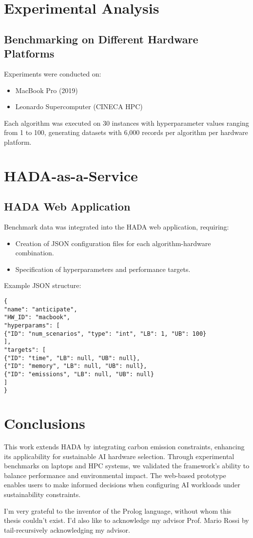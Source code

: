 \documentclass[a4paper,singleside,12pt]{report} %
\begin{document}
\chapter{Experimental Analysis}

\section{Benchmarking on Different Hardware Platforms}
Experiments were conducted on:
\begin{itemize}
\item MacBook Pro (2019)
\item Leonardo Supercomputer (CINECA HPC)
\end{itemize}

Each algorithm was executed on 30 instances with hyperparameter values ranging from 1 to 100, 
generating datasets with 6,000 records per algorithm per hardware platform.

\chapter{HADA-as-a-Service}

\section{HADA Web Application}
Benchmark data was integrated into the HADA web application, requiring:
\begin{itemize}
\item Creation of JSON configuration files for each algorithm-hardware combination.
\item Specification of hyperparameters and performance targets.
\end{itemize}

Example JSON structure:
\begin{verbatim}
{
"name": "anticipate",
"HW_ID": "macbook",
"hyperparams": [
{"ID": "num_scenarios", "type": "int", "LB": 1, "UB": 100}
],
"targets": [
{"ID": "time", "LB": null, "UB": null},
{"ID": "memory", "LB": null, "UB": null},
{"ID": "emissions", "LB": null, "UB": null}
]
}
\end{verbatim}

\chapter{Conclusions}

This work extends HADA by integrating carbon emission constraints, enhancing its applicability 
for sustainable AI hardware selection. Through experimental benchmarks on laptops and HPC systems, 
we validated the framework’s ability to balance performance and environmental impact. The web-based prototype 
enables users to make informed decisions when configuring AI workloads under sustainability constraints.

\appendix

\printbibliography[heading=bibintoc] %

\acknowledgements
I'm very grateful to the inventor of the Prolog language, without whom this thesis couldn't exist. I'd also like 
to acknowledge my advisor Prof. Mario Rossi by tail-recursively acknowledging my advisor.
	
\end{document}
